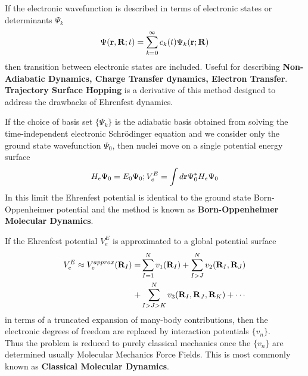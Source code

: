 \documentclass[slidestop,mathserif,compress,xcolor=svgnames]{beamer}
\begin{document}
\begin{frame}[allowframebreaks]
\begin{itemize}
{\item If the electronic wavefunction is described in terms of electronic states or determinants $\Psi_k$
\begin{align*}
\Psi({\bf r},{\bf R};t) = \sum^\infty_{k=0}c_k(t)\Psi_k({\bf r};{\bf R})
\end{align*}
then transition between electronic states are included. Useful for describing {\bf Non-Adiabatic Dynamics, Charge Transfer dynamics, Electron Transfer}. {\bf Trajectory Surface Hopping} is a derivative of this method designed to address the drawbacks of Ehrenfest dynamics.
\item If the choice of basis set $\{\Psi_k\}$ is the adiabatic basis obtained from solving the time-independent electronic Schr\"{o}dinger equation and we consider only the ground state wavefunction $\Psi_0$, then nuclei move on a single potential energy surface 
\begin{align*}
H_e\Psi_0 = E_0\Psi_0 \vspace{0.5cm} ; \vspace{0.5cm}
V^E_e = \int d{\bf r}\Psi^\ast_0 H_e\Psi_0
\end{align*}
In this limit the Ehrenfest potential is identical to the ground state Born-Oppenheimer potential and the method is known as {\bf Born-Oppenheimer Molecular Dynamics}.
\item If the Ehrenfest potential $V^E_e$ is approximated to a global potential surface
\begin{align*}
V^E_e \approx V^{approx}_e({\bf R}_I) = &\sum^{N}_{I=1}v_1({\bf R}_I) + \sum^N_{I>J}v_2({\bf R}_I,{\bf R}_J) \\+ &\sum^N_{I>J>K}v_3({\bf R}_I,{\bf R}_J,{\bf R}_K) + \cdots
\end{align*}
in terms of a truncated expansion of many-body contributions, then the electronic degrees of freedom are replaced by interaction potentials $\{v_n\}$.\\
Thus the problem is reduced to purely classical mechanics once the $\{v_n\}$ are determined usually Molecular Mechanics Force Fields. This is most commonly known as {\bf Classical Molecular Dynamics}.
}
\end{itemize}
\end{frame}
\end{document}
